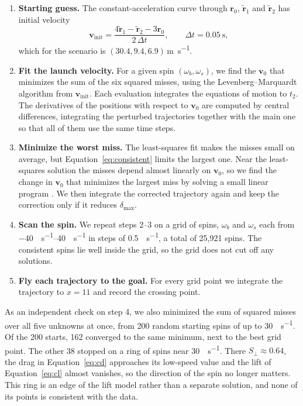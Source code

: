 \documentclass[10pt,a4paper]{article}
\begin{document}
\begin{enumerate}
  \item \textbf{Starting guess.} The constant-acceleration curve through
    $\bm{r}_0$, $\tilde{\bm{r}}_1$ and $\tilde{\bm{r}}_2$ has initial velocity
    \begin{equation}
      \bm{v}_{\mathrm{init}} = \frac{4\tilde{\bm{r}}_1 - \tilde{\bm{r}}_2 - 3\bm{r}_0}{2\,\Delta t},
      \qquad \Delta t = \SI{0.05}{\second},
      \label{eq:vinit}
    \end{equation}
    which for the scenario is $(30.4, 9.4, 6.9)$\,\si{\metre\per\second}.
  \item \textbf{Fit the launch velocity.} For a given spin
    $(\omega_b, \omega_s)$, we find the $\bm{v}_0$ that minimizes the sum of
    the six squared misses, using the Levenberg--Marquardt algorithm
    \citep{levenberg1944, marquardt1963, more1978} from
    $\bm{v}_{\mathrm{init}}$. Each evaluation integrates the equations of
    motion to $t_2$. The derivatives of the positions with respect to
    $\bm{v}_0$ are computed by central differences, integrating the
    perturbed trajectories together with the main one so that all of them
    use the same time steps.
  \item \textbf{Minimize the worst miss.} The least-squares fit makes the
    misses small on average, but Equation~\eqref{eq:consistent} limits the
    largest one. Near the least-squares solution the misses depend almost
    linearly on $\bm{v}_0$, so we find the change in $\bm{v}_0$ that
    minimizes the largest miss by solving a small linear program
    \citep{huangfu2018}. We then integrate the corrected trajectory again and
    keep the correction only if it reduces $\delta_{\max}$. 
  \item \textbf{Scan the spin.} We repeat steps 2--3 on a grid of spins,
    $\omega_b$ and $\omega_s$ each from \SIrange{-40}{40}{\rev\per\second} in
    steps of \SI{0.5}{\rev\per\second}, a total of 25{,}921 spins. The
    consistent spins lie well inside the grid, so the grid does not cut off
    any solutions.
  \item \textbf{Fly each trajectory to the goal.} For every grid point we
    integrate the trajectory to $x = 11$ and record the crossing point.
\end{enumerate}
As an independent check on step 4, we also minimized the sum of squared
misses over all five unknowns at once, from 200 random starting spins of up to
\SI{30}{\rev\per\second}. Of the 200 starts, 162 converged to the same
minimum, next to the best grid point. The other 38 stopped on a ring of
spins near \SI{30}{\rev\per\second}. There $S_\perp \approx 0.64$, the drag in
Equation~\eqref{eq:cd} approaches its low-speed value and the lift of
Equation~\eqref{eq:cl} almost vanishes, so the direction of the spin no longer
matters. This ring is an edge of the lift model rather than a separate
solution, and none of its points is consistent with the data.
\end{document}
